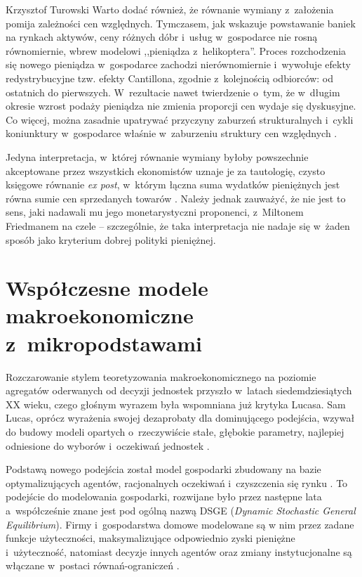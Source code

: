 \begin{artplenv}{Krzysztof Turowski}
Warto dodać również, że równanie wymiany z~założenia pomija zależności cen względnych. Tymczasem, jak wskazuje
powstawanie baniek na rynkach aktywów, ceny różnych dóbr i~usług w~gospodarce nie rosną równomiernie, wbrew modelowi
,,pieniądza z~helikoptera''. Proces rozchodzenia się nowego pieniądza w~gospodarce zachodzi nierównomiernie i~wywołuje efekty
redystrybucyjne tzw. efekty Cantillona, zgodnie z~kolejnością odbiorców: od ostatnich do pierwszych. W~rezultacie nawet
twierdzenie o~tym, że w~długim okresie wzrost podaży pieniądza nie zmienia proporcji cen wydaje się dyskusyjne. Co
więcej, można zasadnie upatrywać przyczyny zaburzeń strukturalnych i~cykli koniunktury w~gospodarce
właśnie w~zaburzeniu struktury cen względnych
\parencite{sieron_efekt_2017}.

Jedyna interpretacja, w~której równanie wymiany byłoby powszechnie akceptowane przez wszystkich ekonomistów uznaje je za
tautologię, czysto księgowe równanie \textit{ex post}, w~którym łączna suma wydatków pieniężnych jest równa sumie cen
sprzedanych towarów
\parencite{yeager_tautologies_1994}.
Należy jednak zauważyć, że nie jest to sens, jaki nadawali
mu jego monetarystyczni proponenci, z~Miltonem Friedmanem na czele  --  szczególnie, że taka interpretacja nie
nadaje się w~żaden sposób jako kryterium dobrej polityki pieniężnej.

\section{Współczesne modele makroekonomiczne z~mikropodstawami}
Rozczarowanie stylem teoretyzowania makroekonomicznego na poziomie agregatów oderwanych od decyzji jednostek
przyszło w~latach siedemdziesiątych XX wieku, czego głośnym wyrazem była wspomniana już krytyka Lucasa. Sam Lucas, oprócz
wyrażenia swojej dezaprobaty dla dominującego podejścia, wzywał do budowy modeli opartych o~rzeczywiście stałe,
głębokie parametry, najlepiej odniesione do wyborów i~oczekiwań jednostek
\parencite{lucas_econometric_1976}.

Podstawą nowego podejścia został model gospodarki zbudowany na bazie optymalizujących agentów, racjonalnych
oczekiwań i~czyszczenia się rynku
\parencite{kydland_time_1982}.
To podejście do modelowania gospodarki,
rozwijane było przez następne lata a~współcześnie znane jest pod ogólną nazwą DSGE (\textit{Dynamic Stochastic General
Equilibrium}). Firmy i~gospodarstwa domowe modelowane są w nim przez zadane funkcje użyteczności, maksymalizujące odpowiednio
zyski pieniężne i~użyteczność, natomiast decyzje innych agentów oraz zmiany instytucjonalne są włączane w~postaci
równań-ograniczeń
\parencite{woodford_interest_2011,gali_macroeconomic_2007}.



\end{artplenv}
